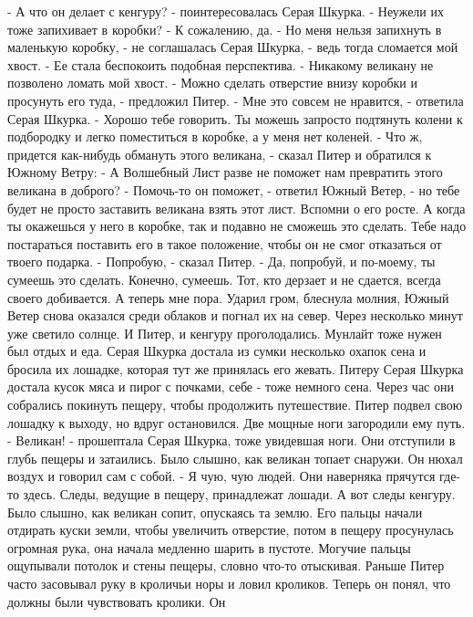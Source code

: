     - А что он делает с кенгуру? - поинтересовалась Серая Шкурка. - 
Неужели их тоже запихивает в коробки?
    - К сожалению, да.
    - Но меня нельзя запихнуть в маленькую коробку, - не соглашалась 
Серая Шкурка, - ведь тогда сломается мой хвост. - Ее стала беспокоить 
подобная перспектива. - Никакому великану не позволено ломать мой 
хвост.
    - Можно сделать отверстие внизу коробки и просунуть его туда, - 
предложил Питер.
    - Мне это совсем не нравится, - ответила Серая Шкурка. - Хорошо 
тебе говорить. Ты можешь запросто подтянуть колени к подбородку и 
легко поместиться в коробке, а у меня нет коленей.
    - Что ж, придется как-нибудь обмануть этого великана, - сказал 
Питер и обратился к Южному Ветру:
    - А Волшебный Лист разве не поможет нам превратить этого великана 
в доброго?
    - Помочь-то он поможет, - ответил Южный Ветер, - но тебе будет не 
просто заставить великана взять этот лист. Вспомни о его росте. А 
когда ты окажешься у него в коробке, так и подавно не сможешь это 
сделать. Тебе надо постараться поставить его в такое положение, чтобы 
он не смог отказаться от твоего подарка.
    - Попробую, - сказал Питер.
    - Да, попробуй, и по-моему, ты сумеешь это сделать. Конечно, 
сумеешь. Тот, кто дерзает и не сдается, всегда своего добивается. А 
теперь мне пора.
    Ударил гром, блеснула молния, Южный Ветер снова оказался среди 
облаков и погнал их на север. Через несколько минут уже светило 
солнце.
    И Питер, и кенгуру проголодались. Мунлайт тоже нужен был отдых и 
еда. Серая Шкурка достала из сумки несколько охапок сена и бросила их 
лошадке, которая тут же принялась его жевать. Питеру Серая Шкурка 
достала кусок мяса и пирог с почками, себе - тоже немного сена.
    Через час они собрались покинуть пещеру, чтобы продолжить 
путешествие. Питер подвел свою лошадку к выходу, но вдруг остановился. 
Две мощные ноги загородили ему путь.
    - Великан! - прошептала Серая Шкурка, тоже увидевшая ноги. Они 
отступили в глубь пещеры и затаились. Было слышно, как великан топает 
снаружи. Он нюхал воздух и говорил сам с собой.
    - Я чую, чую людей. Они наверняка прячутся где-то здесь. Следы, 
ведущие в пещеру, принадлежат лошади. А вот следы кенгуру.
    Было слышно, как великан сопит, опускаясь та землю. Его пальцы 
начали отдирать куски земли, чтобы увеличить отверстие, потом в пещеру 
просунулась огромная рука, она начала медленно шарить в пустоте. 
Могучие пальцы ощупывали потолок и стены пещеры, словно что-то 
отыскивая.
    Раньше Питер часто засовывал руку в кроличьи норы и ловил 
кроликов. Теперь он понял, что должны были чувствовать кролики. Он 
